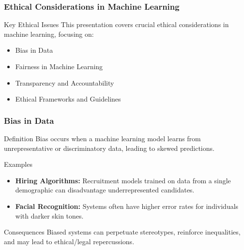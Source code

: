 \documentclass[aspectratio=169]{beamer}
\begin{document}
\begin{frame}[fragile]
    \frametitle{Ethical Considerations in Machine Learning}
    \begin{block}{Key Ethical Issues}
        This presentation covers crucial ethical considerations in machine learning, focusing on:
        \begin{itemize}
            \item Bias in Data
            \item Fairness in Machine Learning
            \item Transparency and Accountability
            \item Ethical Frameworks and Guidelines
        \end{itemize}
    \end{block}
\end{frame}

\begin{frame}[fragile]
    \frametitle{Bias in Data}
    \begin{block}{Definition}
        Bias occurs when a machine learning model learns from unrepresentative or discriminatory data, leading to skewed predictions.
    \end{block}

    \begin{block}{Examples}
        \begin{itemize}
            \item \textbf{Hiring Algorithms:} Recruitment models trained on data from a single demographic can disadvantage underrepresented candidates.
            \item \textbf{Facial Recognition:} Systems often have higher error rates for individuals with darker skin tones.
        \end{itemize}
    \end{block}

    \begin{block}{Consequences}
        Biased systems can perpetuate stereotypes, reinforce inequalities, and may lead to ethical/legal repercussions.
    \end{block}
\end{frame}
\end{document}
